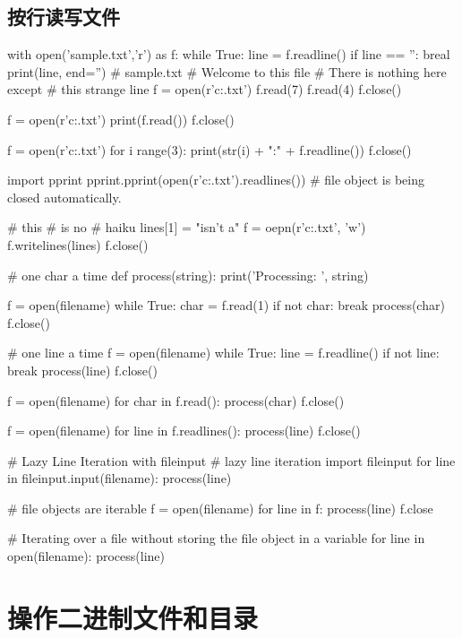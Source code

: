 \subsection{按行读写文件}
\begin{python}
with open('sample.txt','r') as f:
    while True:
        line = f.readline()
        if line == '':
            breal
            print(line, end='')
# sample.txt
# Welcome to this file
# There is nothing here except
# this strange line
f = open(r'c:\text\sample.txt')
f.read(7)
f.read(4)
f.close()

f = open(r'c:\text\sample.txt')
print(f.read())
f.close()

f = open(r'c:\text\sample.txt')
for i range(3):
    print(str(i) + ":" + f.readline())
f.close()

import pprint
pprint.pprint(open(r'c:\text\sample.txt').readlines()) # file object is being closed automatically.

# this
# is no
# haiku
lines[1] = "isn't a\n"
f = oepn(r'c:\text\sample.txt', 'w')
f.writelines(lines)
f.close()

# one char a time
def process(string):
    print('Processing: ', string)

f = open(filename)
while True:
   char = f.read(1)
   if not char: 
        break
   process(char)
f.close()

# one line a time
f = open(filename)
while True:
   line = f.readline()
   if not line: 
        break
   process(line)
f.close()

f = open(filename)
for char in f.read():
    process(char)
f.close()

f = open(filename)
for line in f.readlines():
    process(line)
f.close()

# Lazy Line Iteration with fileinput
# lazy line iteration
import fileinput
for line in fileinput.input(filename):
    process(line)

# file objects are iterable
f = open(filename)
for line in f:
    process(line)
f.close

# Iterating over a file without storing the file object in a variable
for line in open(filename):
    process(line)

\end{python}
\section{操作二进制文件和目录}
